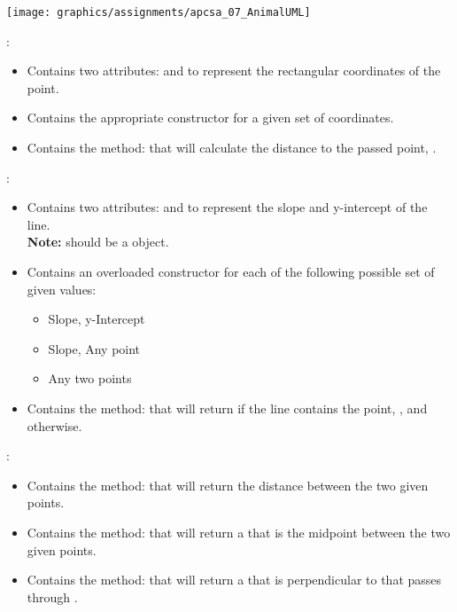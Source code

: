 \begin{questions}
    \begin{center}
      \texttt{[image: graphics/assignments/apcsa\_07\_AnimalUML]}
    \end{center}

    \pagebreak

    :
    \begin{itemize}
      \item Contains two attributes:  and  to represent the rectangular coordinates of the point.
      \item Contains the appropriate constructor for a given set of coordinates.
      \item Contains the method:  that will calculate the distance to the passed point, .
    \end{itemize}

    :
    \begin{itemize}
      \item Contains two attributes:  and  to represent the slope and y-intercept of the line.\\
      {\small\textbf{Note:}  should be a  object.}
      \item Contains an overloaded constructor for each of the following possible set of given values:
      \begin{itemize}
        \item Slope, y-Intercept
        \item Slope, Any point
        \item Any two points
      \end{itemize}
      \item Contains the method:  that will return  if the line contains the point, , and  otherwise.
    \end{itemize}

    :
    \begin{itemize}
      \item Contains the method:  that will return the distance between the two given points.
      \item Contains the method:  that will return a  that is the midpoint between the two given points.
      \item Contains the method:  that will return a  that is perpendicular to  that passes through .
    \end{itemize}
  \end{questions}

